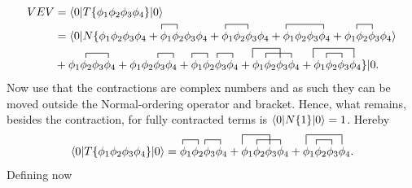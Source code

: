 \begin{example}
\begin{enumerate}
		\begin{equation}
			\begin{split}
				VEV&=\braket{0|T\{\phi_1\phi_2\phi_3\phi_4\}|0}\\
				&
				\contraction{,,,,,,,,,,,,,,,,,,,,}{\phi_1}{.}{\phi_2}
				\contraction{,,,,,,,.,,,,,,,,,,,,,,,,,,,,,,,,,}{\phi_1}{,,}{\phi_2}
				\contraction{,,,,,,,,,,,,,,,,,,,,,,.,,,,,,,,,,,,,,,,,,,,,,}{\phi_1}{,,,,,}{\phi_2}
				\contraction{,,,,,,,,,,,,,,,,,,,,,,,,.,,,,,,,,,,,,,,,,,,,,,,,,,,,,,,,,,,}{\phi_1}{.}{\phi_2}
				=\braket{0|N\{\phi_1\phi_2\phi_3\phi_4+\phi_1\phi_2\phi_3\phi_4+\phi_1\phi_2\phi_3\phi_4+\phi_1\phi_2\phi_3\phi_4+\phi_1\phi_2\phi_3\phi_4}\\
					&{
					\contraction{,,,,,}{\phi_1}{,,}{\phi_2}
					\contraction{,,,,,,,,,,,.,.,,,,,,}{\phi_1}{.}{\phi_2}
					\contraction{,,,,,,,,,,,,,,,,,,,,,,,,,,}{\phi_1}{.}{\phi_2}
					\contraction{,,,,,,,,,,,,,,,,,,,,,,,,,,,,,,,}{\phi_1}{.}{\phi_2}
					\contraction[2ex]{,,,,,,,,,,,,,,,,,,,,,,,,,,,,,,,,,,,,,,}{\phi_1}{,,,}{\phi_2}
					\contraction{,,,,,,.,,,,,,,,,,,,,,,,,,,,,,,,,,,,,,,,,,}{\phi_1}{.,,}{\phi_2}
					\contraction[2ex]{,,,,,,,,,,,,,,,,,,,,,,,,,,,,,,,,,,,,,,,,,,,,,,,,,,}{\phi_1}{,,,,.,}{\phi_2}
					\contraction{,,,,,,.,,,,,,,,,,,,,,,,,,,,,,,,,,,,,,,,,,,,,,,,,,,,,,}{\phi_1}{.}{\phi_2}
					+\phi_1\phi_2\phi_3\phi_4+\phi_1\phi_2\phi_3\phi_4+\phi_1\phi_2\phi_3\phi_4+\phi_1\phi_2\phi_3\phi_4+\phi_1\phi_2\phi_3\phi_4\}|0}.\\
			\end{split}
		\end{equation} 
		Now use that the contractions are complex numbers and as such they can be moved outside the Normal-ordering operator and bracket. Hence, what remains, besides the contraction, for fully contracted terms is $\braket{0|N\{1\}|0}=1$. Hereby
		\begin{equation}
			\contraction{,,,,,,,,,,,,,.,,,,,,.,}{\phi_1}{.}{\phi_2}
			\contraction{,,,,,,,,,,,,,,.,,,,,,,,,,,}{\phi_1}{.}{\phi_2}
			\contraction[2ex]{,,,,,,,,,,,,,,,,,,,,,,,,,,,,,,,,,}{\phi_1}{,,,}{\phi_2}
			\contraction{,,,,,,.,,,,,,,,..,,,,,,,,,,,,,,,,,,,,}{\phi_1}{..,}{\phi_2}
			\contraction[2ex]{,,,,,,,,,,,,,,.,,,,,,,,,,,,,,,,,,,,,,,,,,,,,,,}{\phi_1}{,,,,.}{\phi_2}
			\contraction{,,,,,,.,,,,,,,,,,,,,,,,,,,,,,,,,,,,,,,,,,,,,,,,,}{\phi_1}{.}{\phi_2}
			\braket{0|T\{\phi_1\phi_2\phi_3\phi_4\}|0}=\phi_1\phi_2\phi_3\phi_4+\phi_1\phi_2\phi_3\phi_4+\phi_1\phi_2\phi_3\phi_4.
		\end{equation} 
		Defining now
		\begin{equation}

\end{equation}
\end{enumerate}
\end{example}
